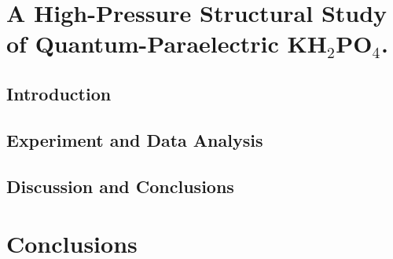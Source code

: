 \section{A High-Pressure Structural Study of Quantum-Paraelectric KH$_2$PO$_4$.}

\subsection{Introduction}

\subsection{Experiment and Data Analysis}

\subsection{Discussion and Conclusions}

\section{Conclusions}

